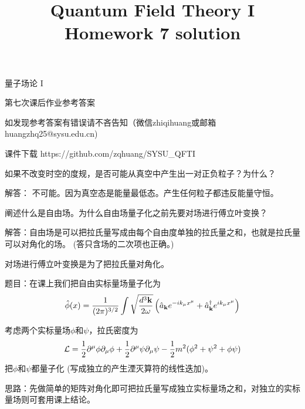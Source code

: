 \documentclass[CJK]{beamer}
\title{Quantum Field Theory I \\ Homework 7 solution}
\author{}
\date{}
\begin{document}
\begin{frame}
 
\begin{center}
\begin{Large}
\bch
量子场论 I 

{\vskip 0.3in}

第七次课后作业参考答案
\skipline
\skipline

如发现参考答案有错误请不吝告知（微信zhiqihuang或邮箱huangzhq25@sysu.edu.cn)
\ech
\end{Large}
\end{center}

\vskip 0.2in

\bch
课件下载
\ech
https://github.com/zqhuang/SYSU\_QFTI

\end{frame}


\begin{frame}
\bch

{\small 
如果不改变时空的度规，是否可能从真空中产生出一对正负粒子？为什么？

\skiplines

解答： 不可能。因为真空态是能量最低态。产生任何粒子都违反能量守恒。
}
\ech
\end{frame}

\begin{frame}
\bch
{
阐述什么是自由场。为什么自由场量子化之前先要对场进行傅立叶变换？

\skiplines

解答：自由场是可以把拉氏量写成由每个自由度单独的拉氏量之和，也就是拉氏量可以对角化的场。 (答只含场的二次项也正确。)

对场进行傅立叶变换是为了把拉氏量对角化。
}
\ech
\end{frame}

\begin{frame}
\bch
{\small
题目：在课上我们把自由实标量场量子化为
$$ {\hat{\phi}}(x) = \frac{1}{(2\pi)^{3/2}} \int \sqrt{\frac{d^3{\mathbf{k}}}{2\omega}} \left({\hat{a}}_{{\mathbf{k}}} e^{-ik_\mu x^\mu} + {\hat{a}^\dagger}_{{\mathbf{k}}}e^{ik_\mu x^\mu}\right) $$

考虑两个实标量场$\phi$和$\psi$，拉氏密度为
$${\mathcal{L}} = \frac{1}{2}\partial^\mu\phi\partial_\mu\phi + \frac{1}{2}\partial^\mu\psi\partial_\mu\psi - \frac{1}{2}m^2(\phi^2+\psi^2+\phi\psi) $$
把$\phi$和$\psi$都量子化 (写成独立的产生湮灭算符的线性迭加)。

\skipline
思路：先做简单的矩阵对角化即可把拉氏量写成独立实标量场之和，对独立的实标量场则可套用课上结论。
}
\ech
\end{frame}
\end{document}
